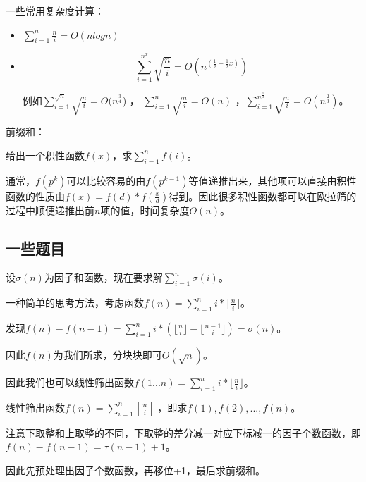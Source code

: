 \vbox{}

{\heiti 一些常用复杂度计算：}

\begin{itemize}
\item $\sum_{i=1}^{n}\frac{n}{i}=O(nlogn)$
\item $$\sum_{i=1}^{n^x}\sqrt{\frac{n}{i}}=O(n^{(\frac{1}{2}+\frac{1}{2}x)})$$

例如$\sum_{i=1}^{\sqrt{n}}\sqrt{\frac{n}{i}}=O(n^{\frac{3}{4}}$)     ，   $\sum_{i=1}^{n}\sqrt{\frac{n}{i}}=O(n)$   ，$\sum_{i=1}^{n^{\frac{1}{3}}}\sqrt{\frac{n}{i}}=O(n^{\frac{2}{3}})$。
\end{itemize}

\vbox{}

{\heiti 前缀和：}

给出一个积性函数$f(x)$，求$\sum_{i=1}^nf(i)$。

通常，$f(p^k)$可以比较容易的由$f(p^{k-1})$等值递推出来，其他项可以直接由积性函数的性质由$f(x)=f(d)*f(\frac{x}{d})$得到。因此很多积性函数都可以在欧拉筛的过程中顺便递推出前$n$项的值，时间复杂度$O(n)$。

\subsection{一些题目}

\begin{example}
设$\sigma(n)$为因子和函数，现在要求解$\sum_{i=1}^n\sigma(i)$。 
\end{example}


\begin{solution}
一种简单的思考方法，考虑函数$f(n)=\sum_{i=1}^ni*\lfloor \frac{n}{i}\rfloor$。  

发现$f(n)-f(n-1)=\sum_{i=1}^ni*(\lfloor \frac{n}{i}\rfloor-\lfloor \frac{n-1}{i}\rfloor)=\sigma(n)$。  

因此$f(n)$为我们所求，分块块即可$O(\sqrt{n})$。
\end{solution}

\begin{note}
因此我们也可以线性筛出函数$f(1...n)=\sum_{i=1}^ni*\lfloor \frac{n}{i}\rfloor$。 
\end{note}

\vbox{}

\begin{example}
线性筛出函数$f(n)=\sum_{i=1}^n\left \lceil \frac{n}{i}  \right \rceil$ ，即求$f(1),f(2),...,f(n)$。
\end{example}


\begin{solution}
注意下取整和上取整的不同，下取整的差分减一对应下标减一的因子个数函数，即$f(n)-f(n-1)=\tau(n-1)+1$。

因此先预处理出因子个数函数，再移位+1，最后求前缀和。
\end{solution}

